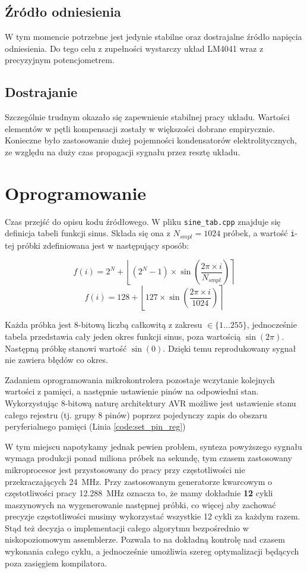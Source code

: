 \documentclass[12pt, a4paper]{article}
\begin{document}
\subsection{Źródło odniesienia}
W tym momencie potrzebne jest jedynie stabilne oraz dostrajalne źródło napięcia odniesienia.
Do tego celu z zupełności wystarczy układ LM4041 wraz z precyzyjnym potencjometrem.

\subsection{Dostrajanie}
Szczególnie trudnym okazało się zapewnienie stabilnej pracy układu. 
Wartości elementów w pętli kompensacji zostały w większości dobrane empirycznie.
Konieczne było zastosowanie dużej pojemności kondensatorów elektrolitycznych, 
ze względu na duży czas propagacji sygnału przez resztę układu.

\section{Oprogramowanie}
\label{sec:impl}
Czas przejść do opisu kodu źródłowego.
W pliku \verb|sine_tab.cpp| znajduje się definicja tabeli funkcji sinus. Składa się ona z $N_{smpl}=1024$ próbek, a wartość \verb|i|-tej próbki 
zdefiniowana jest w następujący sposób:

\begin{equation}
	f(i) = 2^N + \left\lfloor (2^N - 1) \times \sin \left(\frac{2 \pi \times i}{N_{smpl}}\right)\right\rceil
\end{equation}
\begin{equation}
	f(i) = 128 + \left\lfloor 127 \times \sin \left(\frac{2 \pi \times i}{1024}\right)\right\rceil
\end{equation}

Każda próbka jest 8-bitową liczbą całkowitą z zakresu $\in \{1 \dots 255\}$, jednocześnie tabela przedstawia cały jeden okres funkcji sinus,
poza wartością $\sin (2 \pi)$. Następną próbkę stanowi wartość $\sin (0)$. Dzięki temu reprodukowany sygnał nie zawiera błędów co okres.

Zadaniem oprogramowania mikrokontrolera pozostaje wczytanie kolejnych wartości z pamięci,
a następnie ustawienie pinów na odpowiedni stan. Wykorzystując 8-bitową naturę architektury AVR
możliwe jest ustawienie stanu całego rejestru (tj. grupy 8 pinów) poprzez pojedynczy zapis do 
obszaru peryferialnego pamięci (Linia \ref{code:set_pin_reg})

W tym miejscu napotykamy jednak pewien problem, synteza powyższego sygnału wymaga produkcji ponad miliona próbek na sekundę,
tym czasem zastosowany mikroprocesor jest przystosowany do pracy przy częstotliwości nie przekraczających \qty{24}{\MHz}.
Przy zastosowanym generatorze kwarcowym o częstotliwości pracy \qty{12,288}{\MHz} oznacza to, że mamy dokładnie \textbf{12} cykli maszynowych
na wygenerowanie następnej próbki, co więcej aby zachować precyzje częstotliwości musimy wykorzystać wszystkie 12 cykli za każdym razem.
Stąd też decyzja o implementacji całego algorytmu bezpośrednio w niskopoziomowym assemblerze.
Pozwala to na dokładną kontrolę nad czasem wykonania całego cyklu, a jednocześnie umożliwia szereg optymalizacji
będących poza zasięgiem kompilatora.
\end{document}
